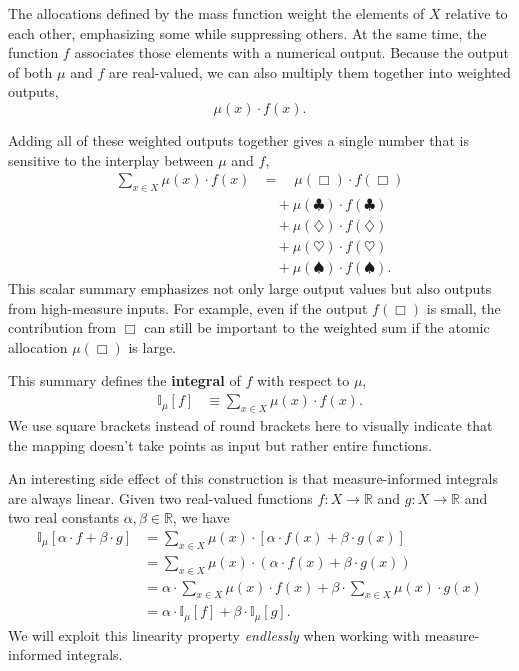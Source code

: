 \documentclass[
  letterpaper,
  DIV=11,
  numbers=noendperiod]{scrartcl}
\begin{document}
The allocations defined by the mass function weight the elements of
\(X\) relative to each other, emphasizing some while suppressing others.
At the same time, the function \(f\) associates those elements with a
numerical output. Because the output of both \(\mu\) and \(f\) are
real-valued, we can also multiply them together into weighted outputs,
\[
\mu(x) \cdot f(x).
\]

Adding all of these weighted outputs together gives a single number that
is sensitive to the interplay between \(\mu\) and \(f\), \begin{align*}
\sum_{x \in X} \mu(x) \cdot f(x)
&=
\quad \mu(\Box) \cdot f(\Box)
\\
&\quad
+ \mu(\clubsuit) \cdot f(\clubsuit)
\\
&\quad
+ \mu(\diamondsuit) \cdot f(\diamondsuit)
\\
&\quad
+ \mu(\heartsuit) \cdot f(\heartsuit)
\\
&\quad
+ \mu(\spadesuit) \cdot f(\spadesuit).
\end{align*} This scalar summary emphasizes not only large output values
but also outputs from high-measure inputs. For example, even if the
output \(f(\Box)\) is small, the contribution from \(\Box\) can still be
important to the weighted sum if the atomic allocation \(\mu(\Box)\) is
large.

This summary defines the \textbf{integral} of \(f\) with respect to
\(\mu\), \begin{align*}
\mathbb{I}_{\mu}[f]
&\equiv \sum_{x \in X} \mu(x) \cdot f(x).
\end{align*} We use square brackets instead of round brackets here to
visually indicate that the mapping doesn't take points as input but
rather entire functions.

An interesting side effect of this construction is that measure-informed
integrals are always linear. Given two real-valued functions
\(f: X \rightarrow \mathbb{R}\) and \(g : X \rightarrow \mathbb{R}\) and
two real constants \(\alpha, \beta \in \mathbb{R}\), we have
\begin{align*}
\mathbb{I}_{\mu}[\alpha \cdot f + \beta \cdot g]
&= \sum_{x \in X} \mu(x) \cdot
\left[ \alpha \cdot f(x) + \beta \cdot g(x) \right]
\\
&=  \sum_{x \in X} \mu(x) \cdot
\left( \alpha \cdot f(x) + \beta \cdot g(x) \right)
\\
&=  \alpha \cdot \sum_{x \in X} \mu(x) \cdot f(x)
  + \beta \cdot \sum_{x \in X} \mu(x) \cdot g(x)
\\
&=  \alpha \cdot \mathbb{I}_{\mu}[f]
  + \beta \cdot \mathbb{I}_{\mu}[g].
\end{align*} We will exploit this linearity property \emph{endlessly}
when working with measure-informed integrals.
\end{document}
